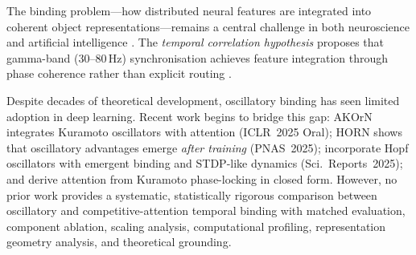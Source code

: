 \documentclass[11pt]{article}
\begin{document}
The binding problem---how distributed neural features are integrated
into coherent object representations---remains a central challenge in
both neuroscience and artificial intelligence
\citep{treisman1980feature,greff2020binding}.  The \emph{temporal
correlation hypothesis} proposes that gamma-band ($30$--$80$\,Hz)
synchronisation achieves feature integration through phase coherence
rather than explicit routing
\citep{vonDerMalsburg1981,singer1995visual}.

Despite decades of theoretical development, oscillatory binding has
seen limited adoption in deep learning.  Recent work begins to bridge
this gap: AKOrN \citep{miyato2025akorn} integrates Kuramoto oscillators
with attention (ICLR~2025 Oral); HORN \citep{engelken2025horn}
shows that oscillatory advantages emerge \emph{after training}
(PNAS~2025); \citet{donn2025} incorporate Hopf oscillators with
emergent binding and STDP-like dynamics (Sci.\ Reports~2025); and
\citet{ssa2025} derive attention from Kuramoto phase-locking in
closed form.  However, no prior work provides a systematic,
statistically rigorous comparison between oscillatory and
competitive-attention temporal binding with matched evaluation,
component ablation, scaling analysis, computational profiling,
representation geometry analysis, and theoretical grounding.
\end{document}

